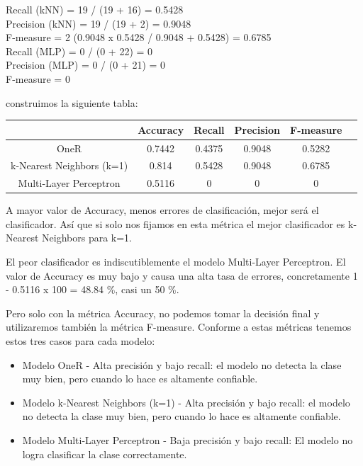 \documentclass[]{article}
\begin{document}
Recall (kNN) = 19 / (19 + 16) = 0.5428 \\
Precision (kNN) = 19 / (19 + 2) = 0.9048 \\
F-measure = 2 (0.9048 x 0.5428 / 0.9048 + 0.5428) = 0.6785 \\

Recall (MLP) = 0 / (0 + 22) = 0 \\
Precision (MLP) = 0 / (0 + 21) = 0 \\
F-measure = 0

construimos la siguiente  tabla:

\begin{center}
	\begin{tabular}{ |c|c|c|c|c|c| } 
		\hline
		& Accuracy & Recall & Precision & F-measure \\
		\hline
		OneR & 0.7442 & 0.4375 & 0.9048 & 0.5282 \\ 
		\hline
		k-Nearest Neighbors (k=1) & 0.814 & 0.5428 & 0.9048 & 0.6785 \\ 
		\hline
		Multi-Layer Perceptron & 0.5116 & 0 & 0 & 0 \\
		\hline
	\end{tabular}
\end{center}


A mayor valor de Accuracy, menos errores de clasificación, mejor será el clasificador. Así que si solo nos fijamos en esta métrica el mejor clasificador es k-Nearest Neighbors para k=1. 

El peor clasificador es indiscutiblemente el modelo Multi-Layer Perceptron. El valor de Accuracy es muy bajo y causa una alta tasa de errores, concretamente 1 - 0.5116 x 100 = 48.84 \%, casi un 50 \%.

Pero solo con la métrica Accuracy, no podemos tomar la decisión final y utilizaremos también la métrica F-measure. Conforme a estas métricas tenemos estos tres casos para cada modelo:

\begin{itemize}
	\item Modelo OneR - Alta precisión y bajo recall: el modelo no detecta la clase muy bien, pero cuando lo hace es altamente confiable.
	\item Modelo k-Nearest Neighbors (k=1) - Alta precisión y bajo recall: el modelo no detecta la clase muy bien, pero cuando lo hace es altamente confiable.
	\item Modelo Multi-Layer Perceptron - Baja precisión y bajo recall: El modelo no logra clasificar la clase correctamente.
\end{itemize}   
\end{document}
